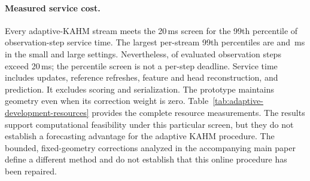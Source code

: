\paragraph{Measured service cost.}
Every adaptive-KAHM stream meets the 20\,ms screen for the 99th
percentile of observation-step service time. The largest per-stream
99th percentiles are \ADSmallPninetyNine{} and
\ADLargePninetyNine{}\,ms in the small and large settings. Nevertheless,
\ADOverruns{} of \ADServiceSteps{} evaluated observation steps exceed
20\,ms; the percentile screen is not a per-step deadline. Service time
includes updates, reference refreshes, feature and head reconstruction,
and prediction. It excludes scoring and serialization. The prototype
maintains geometry even when its correction weight is zero.
Table~\ref{tab:adaptive-development-resources} provides the complete
resource measurements. The results support computational feasibility
under this particular screen, but they do not establish a forecasting
advantage for the adaptive KAHM procedure. The bounded, fixed-geometry corrections analyzed in the accompanying
main paper define a different method and do not establish that this
online procedure has been repaired.
